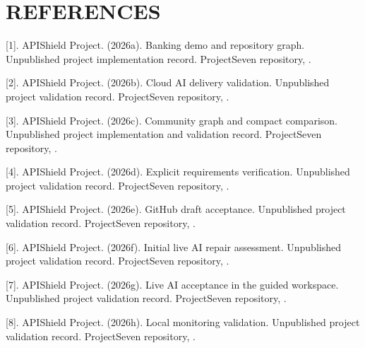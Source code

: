 \documentclass[12pt,a4paper,oneside]{report}
\newcommand{\frontchapter}[1]{\chapter*{#1}\addcontentsline{toc}{chapter}{#1}}
\begin{document}
\frontchapter{REFERENCES}
\begingroup\setlength{\hangindent}{0pt} [1]. APIShield Project. (2026a). Banking demo and repository graph. Unpublished project implementation record. ProjectSeven repository, .\par\endgroup\vspace{6pt}
\begingroup\setlength{\hangindent}{0pt} [2]. APIShield Project. (2026b). Cloud AI delivery validation. Unpublished project validation record. ProjectSeven repository, .\par\endgroup\vspace{6pt}
\begingroup\setlength{\hangindent}{0pt} [3]. APIShield Project. (2026c). Community graph and compact comparison. Unpublished project implementation and validation record. ProjectSeven repository, .\par\endgroup\vspace{6pt}
\begingroup\setlength{\hangindent}{0pt} [4]. APIShield Project. (2026d). Explicit requirements verification. Unpublished project validation record. ProjectSeven repository, .\par\endgroup\vspace{6pt}
\begingroup\setlength{\hangindent}{0pt} [5]. APIShield Project. (2026e). GitHub draft acceptance. Unpublished project validation record. ProjectSeven repository, .\par\endgroup\vspace{6pt}
\begingroup\setlength{\hangindent}{0pt} [6]. APIShield Project. (2026f). Initial live AI repair assessment. Unpublished project validation record. ProjectSeven repository, .\par\endgroup\vspace{6pt}
\begingroup\setlength{\hangindent}{0pt} [7]. APIShield Project. (2026g). Live AI acceptance in the guided workspace. Unpublished project validation record. ProjectSeven repository, .\par\endgroup\vspace{6pt}
\begingroup\setlength{\hangindent}{0pt} [8]. APIShield Project. (2026h). Local monitoring validation. Unpublished project validation record. ProjectSeven repository, .\par\endgroup\vspace{6pt}
\end{document}
